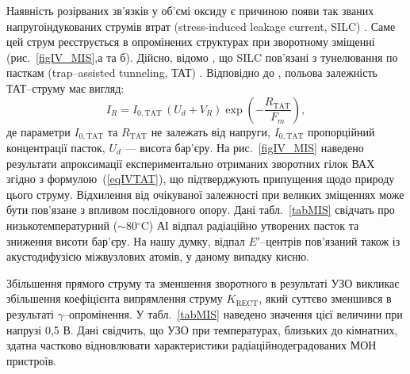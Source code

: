 Наявність розірваних зв'язків у об'ємі оксиду є причиною появи так званих напругоіндукованих струмів втрат (stress-induced leakage current, SILC) \cite{SiO2:Mahapatra,SiO2:DiMaria}.
 Саме цей струм реєструється в опромінених структурах при зворотному зміщенні (рис.~\ref{figIV_MIS},а та б).
Дійсно, відомо \cite{SiO2:Esseni,SiO2:DiMaria}, що SILC пов'язані з тунелювання по пасткам (trap--assisted tunneling, ТАТ) .
Відповідно до \cite{TAT:Gilmore,TAT:GopalSST,TAT:Gopal}, польова залежність ТАТ--струму має вигляд:
\begin{equation}\label{eqIVTAT}
  I_R=I_{0,\mathrm{TAT}}\,(U_d+V_R)\exp\left(-\frac{R_\mathrm{TAT}}{F_m}\right),
\end{equation}
де
параметри $I_{0,\mathrm{TAT}}$ та $R_\mathrm{TAT}$ не залежать від напруги,
$I_{0,\mathrm{TAT}}$ пропорційний концентрації пасток,
$U_d$ --- висота бар'єру.
На рис.~\ref{figIV_MIS} наведено результати апроксимації експериментально отриманих зворотних гілок ВАХ згідно з формулою~(\ref{eqIVTAT}), що підтверджують припущення щодо природу цього струму.
Відхилення від очікуваної залежності при великих зміщеннях може бути пов'язане з впливом послідовного опору.
Дані табл.~\ref{tabMIS} свідчать про низькотемпературний ($\sim$80$^\circ$C) АІ відпал радіаційно утворених пасток та зниження висоти бар'єру.
На нашу думку, відпал $E'$--центрів пов'язаний також із акустодифузією міжвузлових атомів, у даному випадку  кисню.

Збільшення прямого струму та зменшення зворотного в результаті УЗО викликає збільшення коефіцієнта випрямлення струму
$K_\mathrm{RECT}$, який суттєво зменшився в результаті $\gamma$--опромінення.
У табл.~\ref{tabMIS} наведено значення цієї величини при напрузі 0,5 В.
Дані свідчить, що УЗО при температурах, близьких до кімнатних, здатна частково відновлювати характеристики радіаційнодеградованих  МОН  пристроїв.







